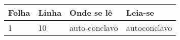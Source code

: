  \begin{table}[htb]
	\centering
	\footnotesize
	\begin{tabular}{|p{1.4cm}|p{1cm}|p{3cm}|p{3cm}|}
		\hline
		\textbf{Folha} & \textbf{Linha}  & \textbf{Onde se lê}  & \textbf{Leia-se}  \\
		\hline
		1 & 10 & auto-conclavo & autoconclavo\\
		\hline
	\end{tabular}
\end{table}